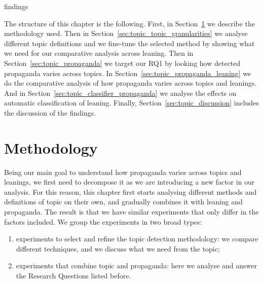 



findings

The structure of this chapter is the following. First, in Section~\ref{sec:topic_method} we describe the methodology used. Then in Section~\ref{sec:topic_topic_granularities} we analyse different topic definitions and we fine-tune the selected method by showing what we need for our comparative analysis across leaning. Then in Section~\ref{sec:topic_propaganda} we target our RQ1 by looking how detected propaganda varies across topics. In Section~\ref{sec:topic_propaganda_leaning} we do the comparative analysis of how propaganda varies across topics and leanings. And in Section~\ref{sec:topic_classifier_propaganda} we analyse the effects on automatic classification of leaning.
Finally, Section~\ref{sec:topic_discussion} includes the discussion of the findings.







\section{Methodology}
\label{sec:topic_method}

Being our main goal to understand how propaganda varies across topics and leanings, we first need to decompose it as we are introducing a new factor in our analysis.
For this reason, this chapter first starts analysing different methods and definitions of topic on their own, and gradually combines it with leaning and propaganda. The result is that we have similar experiments that only differ in the factors included.
We group the experiments in two broad types:
\begin{enumerate}
    \item experiments to select and refine the topic detection methodology: we compare different techniques, and we discuss what we need from the topic; 
    \item experiments that combine topic and propaganda: here we analyse and answer the Research Questions listed before.
\end{enumerate}

